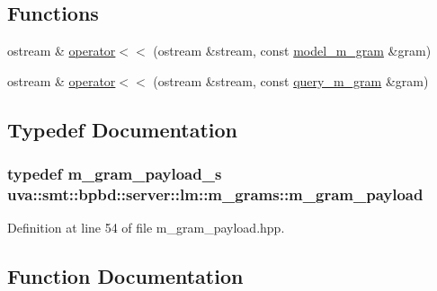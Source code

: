 \subsection*{Functions}
\begin{DoxyCompactItemize}
\item 
ostream \& \hyperlink{namespaceuva_1_1smt_1_1bpbd_1_1server_1_1lm_1_1m__grams_ae8870a115d99e0cace487ad9a7c815de}{operator$<$$<$} (ostream \&stream, const \hyperlink{classuva_1_1smt_1_1bpbd_1_1server_1_1lm_1_1m__grams_1_1model__m__gram}{model\+\_\+m\+\_\+gram} \&gram)
\item 
ostream \& \hyperlink{namespaceuva_1_1smt_1_1bpbd_1_1server_1_1lm_1_1m__grams_a111d69ca51f322c5ab49f88844a895af}{operator$<$$<$} (ostream \&stream, const \hyperlink{classuva_1_1smt_1_1bpbd_1_1server_1_1lm_1_1m__grams_1_1query__m__gram}{query\+\_\+m\+\_\+gram} \&gram)
\end{DoxyCompactItemize}


\subsection{Typedef Documentation}
\hypertarget{namespaceuva_1_1smt_1_1bpbd_1_1server_1_1lm_1_1m__grams_a1422aa6b3f3cb9377916d20e9bf16c0a}{}
\subsubsection[{m\+\_\+gram\+\_\+payload}]{\setlength{\rightskip}{0pt plus 5cm}typedef {\bf m\+\_\+gram\+\_\+payload\+\_\+s} {\bf uva\+::smt\+::bpbd\+::server\+::lm\+::m\+\_\+grams\+::m\+\_\+gram\+\_\+payload}}\label{namespaceuva_1_1smt_1_1bpbd_1_1server_1_1lm_1_1m__grams_a1422aa6b3f3cb9377916d20e9bf16c0a}


Definition at line 54 of file m\+\_\+gram\+\_\+payload.\+hpp.



\subsection{Function Documentation}
\hypertarget{namespaceuva_1_1smt_1_1bpbd_1_1server_1_1lm_1_1m__grams_ae8870a115d99e0cace487ad9a7c815de}{}

